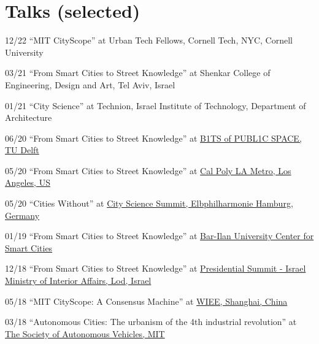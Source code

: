 \section*{Talks (selected)}

\begin{tablist}

    \item[12/22] \tab \enquote{MIT CityScope} at
    {Urban Tech Fellows, Cornell Tech, NYC, Cornell University }

    \item[03/21] \tab \enquote{From Smart Cities to Street Knowledge} at
    {Shenkar College of Engineering, Design and Art, Tel Aviv, Israel}

    \item[01/21] \tab \enquote{City Science} at
    {Technion, Israel Institute of Technology, Department of Architecture}

    \item[06/20] \tab \enquote{From Smart Cities to Street Knowledge} at
    \href{http://www.polistudelft.nl/urbanism-week/b1ts-of-publ1c-space-3-0/}{B1TS of PUBL1C SPACE, TU Delft}

    \item[05/20] \tab \enquote{From Smart Cities to Street Knowledge} at
    \href{https://www.youtube.com/watch?v=Rh5ks9x3720}{Cal Poly LA Metro, Los Angeles, US}

    \item[05/20] \tab \enquote{Cities Without} at
    \href{https://www.youtube.com/watch?v=PZg6A_A65lQ}{City Science Summit, Elbphilharmonie Hamburg, Germany}

    \item[01/19] \tab \enquote{From Smart Cities to Street Knowledge} at
    \href{https://law.biu.ac.il/sites/law/files/shared/mrym_khkmvt_lkhkmt_hrkhvb.pdf}{
        Bar-Ilan University Center for Smart Cities}

    \item[12/18] \tab \enquote{From Smart Cities to Street Knowledge} at
    \href{https://www.youtube.com/watch?v=skIEkM9-1yg}{Presidential Summit - Israel Ministry of Interior Affairs, Lod, Israel}

    \item[05/18] \tab \enquote{MIT CityScope: A Consensus Machine} at
    \href{https://wiee.tongji.edu.cn/CSS2018/}{WIEE, Shanghai, China}

    \item[03/18] \tab \enquote{Autonomous Cities: The urbanism of the 4th industrial revolution} at \href{http://cameraculture.media.mit.edu/category/blog/}{The Society of Autonomous Vehicles, MIT}


\end{tablist}
